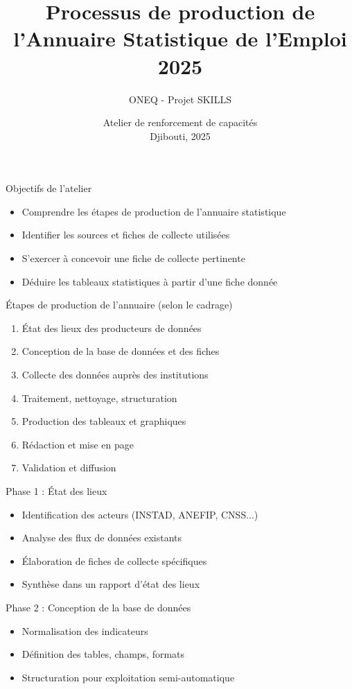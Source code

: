 \documentclass{beamer}
\title{Processus de production de l'Annuaire Statistique de l'Emploi 2025}
\author{ONEQ - Projet SKILLS}
\date{Atelier de renforcement de capacités\\Djibouti, 2025}
\begin{document}
\frame{\titlepage}

\begin{frame}{Objectifs de l'atelier}
\begin{itemize}
    \item Comprendre les étapes de production de l'annuaire statistique
    \item Identifier les sources et fiches de collecte utilisées
    \item S'exercer à concevoir une fiche de collecte pertinente
    \item Déduire les tableaux statistiques à partir d'une fiche donnée
\end{itemize}
\end{frame}

\begin{frame}{Étapes de production de l'annuaire (selon le cadrage)}
\begin{enumerate}
    \item État des lieux des producteurs de données
    \item Conception de la base de données et des fiches
    \item Collecte des données auprès des institutions
    \item Traitement, nettoyage, structuration
    \item Production des tableaux et graphiques
    \item Rédaction et mise en page
    \item Validation et diffusion
\end{enumerate}
\end{frame}

\begin{frame}{Phase 1 : État des lieux}
\begin{itemize}
    \item Identification des acteurs (INSTAD, ANEFIP, CNSS...)
    \item Analyse des flux de données existants
    \item Élaboration de fiches de collecte spécifiques
    \item Synthèse dans un rapport d'état des lieux
\end{itemize}
\end{frame}

\begin{frame}{Phase 2 : Conception de la base de données}
\begin{itemize}
    \item Normalisation des indicateurs
    \item Définition des tables, champs, formats
    \item Structuration pour exploitation semi-automatique
\end{itemize}
\end{frame}
\end{document}
